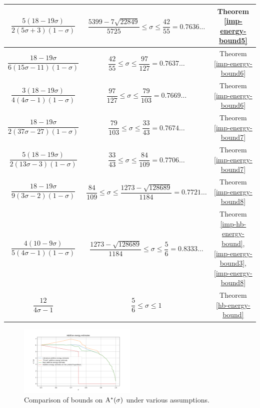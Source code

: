 \begin{table}[ht]
\begin{tabular}{|c|c|c|}
    \hline
    $\dfrac{5(18 - 19\sigma)}{2(5\sigma + 3)(1 - \sigma)}$ & $\dfrac{5399 - 7\sqrt{22849}}{5725} \leq \sigma \le \dfrac{42}{55} = 0.7636\ldots$ & Theorem \ref{imp-energy-bound5}\\
    \hline
    $\dfrac{18 - 19\sigma}{6(15\sigma - 11)(1- \sigma)}$ & $\dfrac{42}{55} \leq \sigma \le \dfrac{97}{127} = 0.7637\ldots$ & Theorem \ref{imp-energy-bound6}\\
    \hline
    $\dfrac{3(18-19\sigma)}{4(4\sigma-1)(1 - \sigma)}$ & $\dfrac{97}{127} \leq \sigma \le \dfrac{79}{103} = 0.7669\ldots$ & Theorem \ref{imp-energy-bound6}\\
    \hline
    $\dfrac{18 - 19\sigma}{2(37\sigma - 27)(1 - \sigma)}$ & $\dfrac{79}{103} \leq \sigma \le \dfrac{33}{43} = 0.7674\ldots$ & Theorem \ref{imp-energy-bound7}\\
    \hline
    $\dfrac{5(18 - 19\sigma)}{2(13\sigma - 3)(1 - \sigma)}$ & $\dfrac{33}{43} \leq \sigma \le \dfrac{84}{109} = 0.7706\ldots$ & Theorem \ref{imp-energy-bound7}\\
    \hline
    $\dfrac{18 - 19\sigma}{9(3\sigma - 2)(1 - \sigma)}$ & $\dfrac{84}{109} \leq \sigma \le \dfrac{1273 - \sqrt{128689}}{1184} = 0.7721\ldots$ & Theorem \ref{imp-energy-bound8}\\
    \hline
    $\dfrac{4(10 - 9\sigma)}{5(4\sigma - 1)(1 - \sigma)}$ & $\dfrac{1273 - \sqrt{128689}}{1184} \leq \sigma \le \dfrac{5}{6} = 0.8333\ldots$ & Theorem \ref{imp-hb-energy-bound}, \ref{imp-energy-bound3}, \ref{imp-energy-bound8}\\
    \hline
    $\dfrac{12}{4\sigma - 1}$ & $\dfrac{5}{6} \leq \sigma \le 1$ & Theorem \ref{hb-energy-bound}\\
    \hline
    \end{tabular}
    \label{zero-density-energy-estimates-table}
\end{table}

\begin{figure}
    \centering
    \includegraphics[width=0.5\textwidth]{chapter/zero_density_energy_estimate.png}
    \caption{Comparison of bounds on $\mathrm{A}^*(\sigma)$ under various assumptions.}
    \label{fig:zero_density_energy_estimate}
\end{figure}

